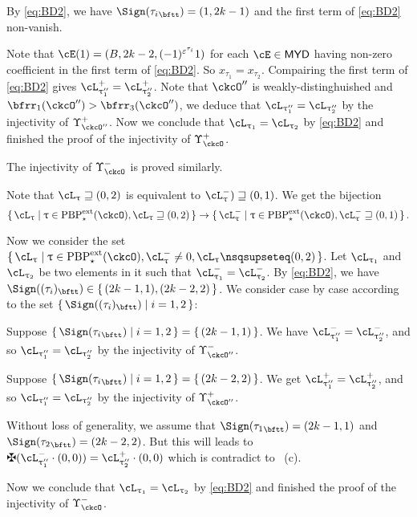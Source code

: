 \documentclass[12pt,a4paper]{amsart}
\def\MYD{{\mathsf{MYD}}}
\def\pac#1{\ac_{#1}^+}
\def\nac#1{\ac_{#1}^-}
\def\ttail#1{{#1}_{\bftt}}
\def\ac{\cL}
\numberwithin{equation}{section}
\theoremstyle{remark}
\def\PBPes{\mathrm{PBP}^{\mathrm{ext}}_{\star}}
\def\uptaupp{\uptau^{\prime\prime}}
\begin{document}
  By \eqref{eq:BD2}, we have $\Sign(\ttail{\tau_{i}}) = (1,2k-1)$ and the first term of \eqref{eq:BD2} non-vanish.

    Note that $\cE(1) = (B,2k-2,(-1)^{\varepsilon^{\tau_{i}}}1)$ for each $\cE\in \MYD$ having non-zero
    coefficient in the first term of \eqref{eq:BD2}. So $x_{\tau_{1}}=x_{\tau_{2}}$.
    Compairing the first term of \eqref{eq:BD2} gives $\pac{\uptaupp_{1}}=\pac{\uptaupp_{2}}$.
    Note that $\ckcO''$ is weakly-distinghuished and $\bfrr_{1}(\ckcO'')>\bfrr_{3}(\ckcO'')$, we deduce that
    $\ac_{\uptaupp_{1}}=\ac_{\uptaupp_{2}}$ by the injectivity of $\Upsilon_{\ckcO''}^{+}$.
    Now we conclude that $\ac_{ \uptau_{1} }=\ac_{ \uptau_{2} }$ by \eqref{eq:BD2} and
    finished the proof of the injectivity of $\Upsilon_{\ckcO}^{+}$.

    \smallskip

    The injectivity of $\Upsilon_{\ckcO}^{-}$ is proved similarly.

  Note that $\ac_{\uptau}\sqsupseteq (0,2)$ is equivalent to
  $\nac{\uptau})\sqsupseteq (0,1)$.
  We get the bijection
  \[
    \set{\ac_{\uptau}|\uptau\in \PBPes(\ckcO),\ac_{\uptau}\sqsupseteq (0,2)} \rightarrow
    \set{\nac{\uptau}|\uptau\in \PBPes(\ckcO),\nac{\uptau}\sqsupseteq (0,1)}.
  \]

  Now we consider the set
  $\set{\ac_{\uptau}|\uptau\in \PBPes(\ckcO),\nac{\uptau}\neq 0, \ac_{\uptau}\nsqsupseteq (0,2)}$.
  Let $\ac_{\uptau_{1}}$ and $\ac_{\uptau_{2}}$ be two elements in it such that
  $\nac{\uptau_{1}}=\nac{\uptau_{2}}$.
  By \eqref{eq:BD2}, we have $\Sign((\tau_{i})_{\bftt}) \in \set{ (2k-1,1),(2k-2,2)}$.
  We consider case by case according to the set $\set{\Sign((\tau_{i})_{\bftt})|i=1,2}$:
  \begin{enumPF}
    \item Suppose
    $\set{\Sign({\tau_{i}}_{\bftt})|i=1,2} = \set{(2k-1,1)}$.
    We have $\nac{\uptau''_{1}} = \nac{\uptau''_{2}}$, and so
    $\ac_{\uptaupp_{1}}=\ac_{\uptaupp_{2}}$ by the injectivity of $\Upsilon_{\ckcO''}^{-}$.
    \item Suppose
    $\set{\Sign({\tau_{i}}_{\bftt})|i=1,2} = \set{(2k-2,2)}$. We get
    $\pac{\uptau''_{1}} = \pac{\uptau''_{2}}$, and so
    $\ac_{\uptaupp_{1}}=\ac_{\uptaupp_{2}}$ by the injectivity of $\Upsilon_{\ckcO''}^{+}$.
    \item
    Without loss of generality, we assume that
    $\Sign({\tau_{1}}_{\bftt}) = (2k-1,1)$ and
    $\Sign({\tau_{2}}_{\bftt}) = (2k-2,2)$.
    But this will leads to
    $\maltese (\nac{\uptau''_{1}}\cdot (0,0)) = \pac{\uptau''_{2}}\cdot (0,0)$
    which is contradict to ~(c).
  \end{enumPF}
  Now we conclude that $\ac_{ \uptau_{1} }=\ac_{ \uptau_{2} }$ by \eqref{eq:BD2} and
  finished the proof of the injectivity of $\Upsilon_{\ckcO}^{-}$.
\end{document}
